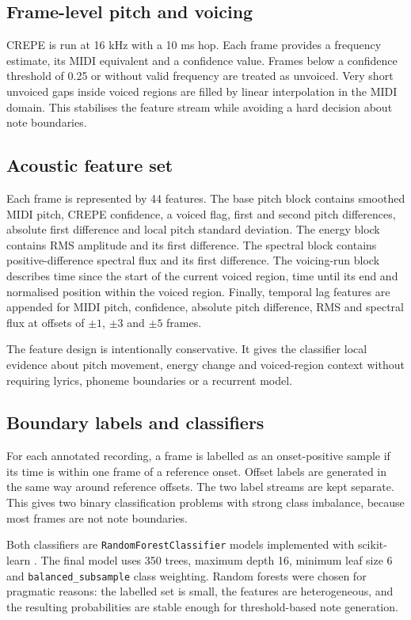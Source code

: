 \documentclass[pdflatex,sn-mathphys-num]{sn-jnl}
\begin{document}
\subsection{Frame-level pitch and voicing}

CREPE is run at 16 kHz with a 10 ms hop. Each frame provides a frequency estimate, its MIDI equivalent and a confidence value. Frames below a confidence threshold of 0.25 or without valid frequency are treated as unvoiced. Very short unvoiced gaps inside voiced regions are filled by linear interpolation in the MIDI domain. This stabilises the feature stream while avoiding a hard decision about note boundaries.

\subsection{Acoustic feature set}

Each frame is represented by 44 features. The base pitch block contains smoothed MIDI pitch, CREPE confidence, a voiced flag, first and second pitch differences, absolute first difference and local pitch standard deviation. The energy block contains RMS amplitude and its first difference. The spectral block contains positive-difference spectral flux and its first difference. The voicing-run block describes time since the start of the current voiced region, time until its end and normalised position within the voiced region. Finally, temporal lag features are appended for MIDI pitch, confidence, absolute pitch difference, RMS and spectral flux at offsets of $\pm1$, $\pm3$ and $\pm5$ frames.

The feature design is intentionally conservative. It gives the classifier local evidence about pitch movement, energy change and voiced-region context without requiring lyrics, phoneme boundaries or a recurrent model.

\subsection{Boundary labels and classifiers}

For each annotated recording, a frame is labelled as an onset-positive sample if its time is within one frame of a reference onset. Offset labels are generated in the same way around reference offsets. The two label streams are kept separate. This gives two binary classification problems with strong class imbalance, because most frames are not note boundaries.

Both classifiers are \texttt{RandomForestClassifier} models implemented with scikit-learn \cite{pedregosa2011sklearn}. The final model uses 350 trees, maximum depth 16, minimum leaf size 6 and \texttt{balanced\_subsample} class weighting. Random forests were chosen for pragmatic reasons: the labelled set is small, the features are heterogeneous, and the resulting probabilities are stable enough for threshold-based note generation.
\end{document}

